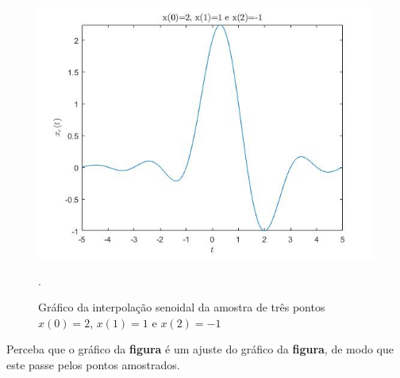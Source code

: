 \documentclass[a4paper, 12pt]{article}
\begin{document}
\begin{figure}[H]
	\centering
	\includegraphics[scale=0.6]{../Imagens/ex6/c.jpg} 
	\caption{Gráfico da interpolação senoidal da amostra de três pontos $x(0)=2$, $x(1)=1$ e $x(2)=-1$}.
	\label{fig:1a}
\end{figure}

Perceba que o gráfico da \textbf{figura} é um ajuste do gráfico da \textbf{figura}, de modo que este passe pelos pontos amostrados.
\end{document}
